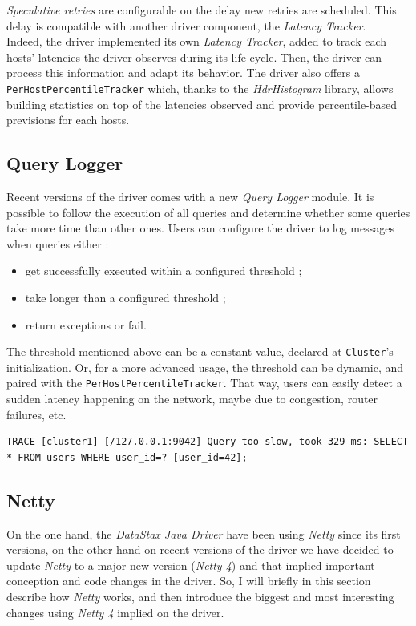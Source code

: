 \documentclass[a4paper]{report}
\newcommand{\djd}{\emph{DataStax Java Driver\xspace}}
\begin{document}
\emph{Speculative retries} are configurable on the delay new retries are scheduled. This delay is compatible with another driver component, the \emph{Latency Tracker}.\\
Indeed, the driver implemented its own \emph{Latency Tracker}, added to track each hosts' latencies the driver observes during its life-cycle. Then, the driver can process this information and adapt its behavior. The driver also offers a \verb;PerHostPercentileTracker; which, thanks to the \emph{HdrHistogram} library, allows building statistics on top of the latencies observed and provide percentile-based previsions for each hosts.

\subsection{Query Logger}
Recent versions of the driver comes with a new \emph{Query Logger} module. It is possible to follow the execution of all queries and determine whether some queries take more time than other ones. Users can configure the driver to log messages when queries either :
\begin{itemize}
   \item get successfully executed within a configured threshold ;
   \item take longer than a configured threshold ;
   \item return exceptions or fail.
\end{itemize}
The threshold mentioned above can be a constant value, declared at \verb;Cluster;'s initialization. Or, for a more advanced usage, the threshold can be dynamic, and paired with the \verb;PerHostPercentileTracker;. That way, users can easily detect a sudden latency happening on the network, maybe due to congestion, router failures, etc.
\begin{lstlisting}[label=ql-ex-1, caption=Query Logger live action, style=Java]
TRACE [cluster1] [/127.0.0.1:9042] Query too slow, took 329 ms: SELECT * FROM users WHERE user_id=? [user_id=42];
\end{lstlisting}

\subsection{Netty}
On the one hand, the \djd{} have been using \emph{Netty} since its first versions, on the other hand on recent versions of the driver we have decided to update \emph{Netty} to a major new version (\emph{Netty 4}) and that implied important conception and code changes in the driver. So, I will briefly in this section describe how \emph{Netty} works, and then introduce the biggest and most interesting changes using \emph{Netty 4} implied on the driver.
\end{document}
